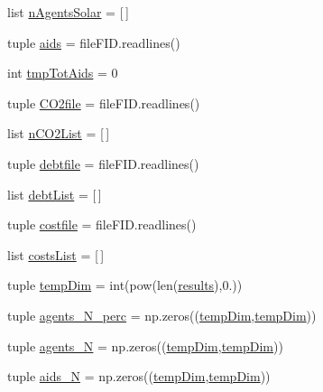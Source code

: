 \begin{DoxyCompactItemize}
list \hyperlink{namespacea__policies_analysis_a33bc8104b9df7e306ea42c722d09cecd}{n\-Agents\-Solar} = \mbox{[}$\,$\mbox{]}
\item 
tuple \hyperlink{namespacea__policies_analysis_ad17c9d07e6a4475d6ff28ed051ace583}{aids} = file\-F\-I\-D.\-readlines()
\item 
int \hyperlink{namespacea__policies_analysis_a32c9367895d62e7740179567b4c74fb5}{tmp\-Tot\-Aids} = 0
\item 
tuple \hyperlink{namespacea__policies_analysis_ab97620097697e1a2c443ca9246630937}{C\-O2file} = file\-F\-I\-D.\-readlines()
\item 
list \hyperlink{namespacea__policies_analysis_aa5802e91f6270b0ca7404e7b477825ac}{n\-C\-O2\-List} = \mbox{[}$\,$\mbox{]}
\item 
tuple \hyperlink{namespacea__policies_analysis_a58b36724729244e0f335c0f69a2f6785}{debtfile} = file\-F\-I\-D.\-readlines()
\item 
list \hyperlink{namespacea__policies_analysis_a47a220e7714790ec8daf36ee5b629a8f}{debt\-List} = \mbox{[}$\,$\mbox{]}
\item 
tuple \hyperlink{namespacea__policies_analysis_aedb8aad3a5765a23d90c365e115a6191}{costfile} = file\-F\-I\-D.\-readlines()
\item 
list \hyperlink{namespacea__policies_analysis_ac2808691a02e6611d1e62cace51d2413}{costs\-List} = \mbox{[}$\,$\mbox{]}
\item 
tuple \hyperlink{namespacea__policies_analysis_a660b69c1bc10800977daca0cb962ac7f}{temp\-Dim} = int(pow(len(\hyperlink{namespacea__policies_analysis_aa5c33ed44128c3628bd9816f34c7d7a0}{results}),0.))
\item 
tuple \hyperlink{namespacea__policies_analysis_a7815063cb21e89278e2073045c265ab1}{agents\-\_\-\-N\-\_\-perc} = np.\-zeros((\hyperlink{namespacea__policies_analysis_a660b69c1bc10800977daca0cb962ac7f}{temp\-Dim},\hyperlink{namespacea__policies_analysis_a660b69c1bc10800977daca0cb962ac7f}{temp\-Dim}))
\item 
tuple \hyperlink{namespacea__policies_analysis_adec2b86353098e680f65251021bb96e9}{agents\-\_\-\-N} = np.\-zeros((\hyperlink{namespacea__policies_analysis_a660b69c1bc10800977daca0cb962ac7f}{temp\-Dim},\hyperlink{namespacea__policies_analysis_a660b69c1bc10800977daca0cb962ac7f}{temp\-Dim}))
\item 
tuple \hyperlink{namespacea__policies_analysis_acea698d5a752396651a6805aa2df3fa7}{aids\-\_\-\-N} = np.\-zeros((\hyperlink{namespacea__policies_analysis_a660b69c1bc10800977daca0cb962ac7f}{temp\-Dim},\hyperlink{namespacea__policies_analysis_a660b69c1bc10800977daca0cb962ac7f}{temp\-Dim}))

\end{DoxyCompactItemize}
